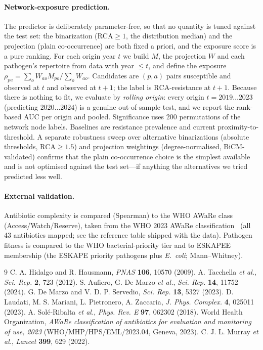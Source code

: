 \documentclass[11pt]{article}
\newcommand{\rca}{\mathrm{RCA}}
\begin{document}
\paragraph{Network-exposure prediction.} The predictor is deliberately parameter-free, so that no
quantity is tuned against the test set: the binarization ($\rca\ge 1$, the distribution median) and the
projection (plain co-occurrence) are both fixed a priori, and the exposure score is a pure ranking. For each origin
year $t$ we build $M$, the projection $W$ and each pathogen's repertoire from data with year $\le t$,
and define the exposure $\rho_{pa}=\sum_{o} W_{ao} M_{po}/\sum_o W_{ao}$. Candidates are $(p,a)$ pairs
susceptible and observed at $t$ and observed at $t+1$; the label is $\rca$-resistance at $t+1$. Because
there is nothing to fit, we evaluate by \emph{rolling origin}: every origin $t=2019\ldots2023$
(predicting $2020\ldots2024$) is a genuine out-of-sample test, and we report the rank-based AUC per
origin and pooled. Significance uses \num{200} permutations of the network node labels. Baselines are
resistance prevalence and current proximity-to-threshold. A separate robustness sweep over alternative
binarizations (absolute thresholds, $\rca\ge1.5$) and projection weightings (degree-normalised,
BiCM-validated) confirms that the plain co-occurrence choice is the simplest available and is not
optimised against the test set---if anything the alternatives we tried predicted less well.

\paragraph{External validation.} Antibiotic complexity is compared (Spearman) to the WHO AWaRe class
(Access/Watch/Reserve), taken from the WHO 2023 AWaRe classification~\cite{who_aware} (all
\num{43} antibiotics mapped; see the reference table shipped with the data). Pathogen fitness is
compared to the WHO bacterial-priority tier and to ESKAPEE membership (the ESKAPE priority pathogens
plus \textit{E.\ coli}; Mann--Whitney).

\begin{thebibliography}{9}
 C. A. Hidalgo and R. Hausmann, \textit{PNAS} \textbf{106}, 10570 (2009).
 A. Tacchella \textit{et al.}, \textit{Sci. Rep.} \textbf{2}, 723 (2012).
 S. Aufiero, G. De Marzo \textit{et al.}, \textit{Sci. Rep.} \textbf{14}, 11752 (2024).
 G. De Marzo and V. D. P. Servedio, \textit{Sci. Rep.} \textbf{13}, 5327 (2023).
 D. Laudati, M. S. Mariani, L. Pietronero, A. Zaccaria, \textit{J. Phys. Complex.} \textbf{4}, 025011 (2023).
 A. Sol\'e-Ribalta \textit{et al.}, \textit{Phys. Rev. E} \textbf{97}, 062302 (2018).
 World Health Organization, \textit{AWaRe classification of antibiotics for evaluation and monitoring of use, 2023} (WHO/MHP/HPS/EML/2023.04, Geneva, 2023).
 C. J. L. Murray \textit{et al.}, \textit{Lancet} \textbf{399}, 629 (2022).
\end{thebibliography}
\end{document}
